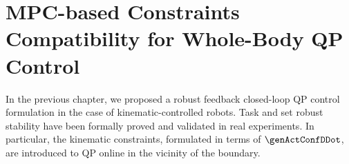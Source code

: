 
\chapter{MPC-based Constraints Compatibility for Whole-Body QP Control}\label{chap:mpc ref gov}


In the previous chapter, we proposed a robust feedback closed-loop QP control formulation in the case of kinematic-controlled robots. Task and set robust stability have been formally proved and validated in real experiments. In particular, the kinematic constraints, formulated in terms of $\genActConfDDot$, are introduced to QP online in the vicinity of the boundary. %


